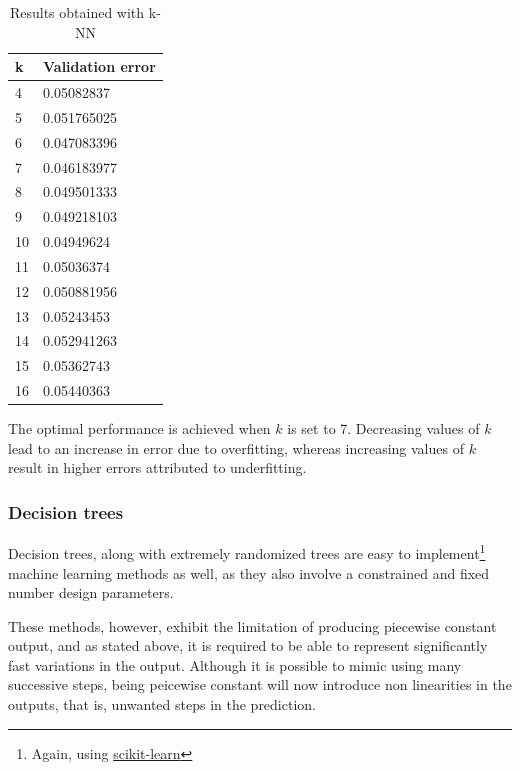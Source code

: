 \begin{table}[h]
    \centering
    \begin{tabular}{|l|l|}
        \hline
        k & Validation error \\ \hline
        4  & 0.05082837 \\
        5  & 0.051765025 \\
        6  & 0.047083396 \\
        7  & 0.046183977 \\
        8  & 0.049501333 \\
        9  & 0.049218103 \\
        10 & 0.04949624 \\
        11 & 0.05036374 \\
        12 & 0.050881956 \\
        13 & 0.05243453 \\
        14 & 0.052941263 \\
        15 & 0.05362743 \\
        16 & 0.05440363 \\ \hline
    \end{tabular}
    \caption{Results obtained with k-NN}
    \label{tab:results-knn}
\end{table}

The optimal performance is achieved when $k$ is set to 7. Decreasing values of $k$ lead to an increase in error due to overfitting, whereas increasing values of $k$ result in higher errors attributed to underfitting.

\subsubsection{Decision trees}

Decision trees, along with extremely randomized trees \cite{extremely-randomized-trees} are easy to implement\footnote{Again, using \href{https://scikit-learn.org/stable/modules/ensemble.html\#forests-of-randomized-trees}{scikit-learn}} machine learning methods as well, as they also involve a constrained and fixed number design parameters.

These methods, however, exhibit the limitation of producing piecewise constant output, and as stated above, it is required to be able to represent significantly fast variations in the output. Although it is possible to mimic using many successive steps, being peicewise constant will now introduce non linearities in the outputs, that is, unwanted steps in the prediction.

